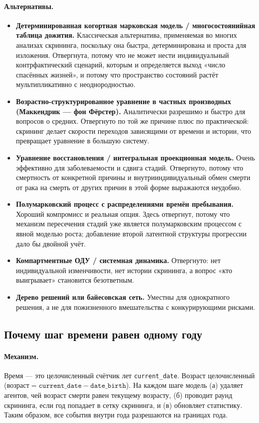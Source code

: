 \documentclass[12pt,a4paper]{article}
\newcommand{\id}[1]{\texttt{#1}}
\newcommand{\mech}[1]{\paragraph{Механизм.} #1}
\newcommand{\alt}[1]{\paragraph{Альтернативы.} #1}
\begin{document}
\alt{\begin{itemize}[nosep]
  \item \textbf{Детерминированная когортная марковская модель / многосостоянийная таблица дожития.}
        Классическая альтернатива, применяемая во многих анализах скрининга, поскольку она быстра,
        детерминирована и проста для изложения. Отвергнута, потому что не может нести индивидуальный
        контрфактический сценарий, которым и определяется выход «число спасённых жизней», и потому что
        пространство состояний растёт мультипликативно с неоднородностью.
  \item \textbf{Возрастно-структурированное уравнение в частных производных (Маккендрик --- фон Фёрстер).}
        Аналитически разрешимо и быстро для вопросов о средних. Отвергнуто по той же причине плюс по
        практической: скрининг делает скорости переходов зависящими от времени и истории, что превращает
        уравнение в большую систему.
  \item \textbf{Уравнение восстановления / интегральная проекционная модель.} Очень эффективно для
        заболеваемости и сдвига стадий. Отвергнуто, потому что смертность от конкретной причины и
        внутрииндивидуальный обмен смерти от рака на смерть от других причин в этой форме выражаются
        неудобно.
  \item \textbf{Полумарковский процесс с распределениями времён пребывания.} Хороший компромисс и реальная
        опция. Здесь отвергнут, потому что механизм пересечения стадий уже является полумарковским
        процессом с явной моделью роста; добавление второй латентной структуры прогрессии дало бы двойной
        учёт.
  \item \textbf{Компартментные ОДУ / системная динамика.} Отвергнуто: нет индивидуальной изменчивости, нет
        истории скрининга, а вопрос «кто выигрывает» становится безответным.
  \item \textbf{Дерево решений или байесовская сеть.} Уместны для однократного решения, а не для
        пожизненного вмешательства с конкурирующими рисками.
\end{itemize}}

\subsection{Почему шаг времени равен одному году}

\mech{Время --- это целочисленный счётчик лет \id{current\_date}. Возраст целочисленный
($\text{возраст} = \id{current\_date} - \id{date\_birth}$). На каждом шаге модель (а) удаляет агентов, чей
возраст смерти равен текущему возрасту, (б) проводит раунд скрининга, если год попадает в сетку скрининга,
и (в) обновляет статистику. Таким образом, все события внутри года разрешаются на границах года.}
\end{document}
